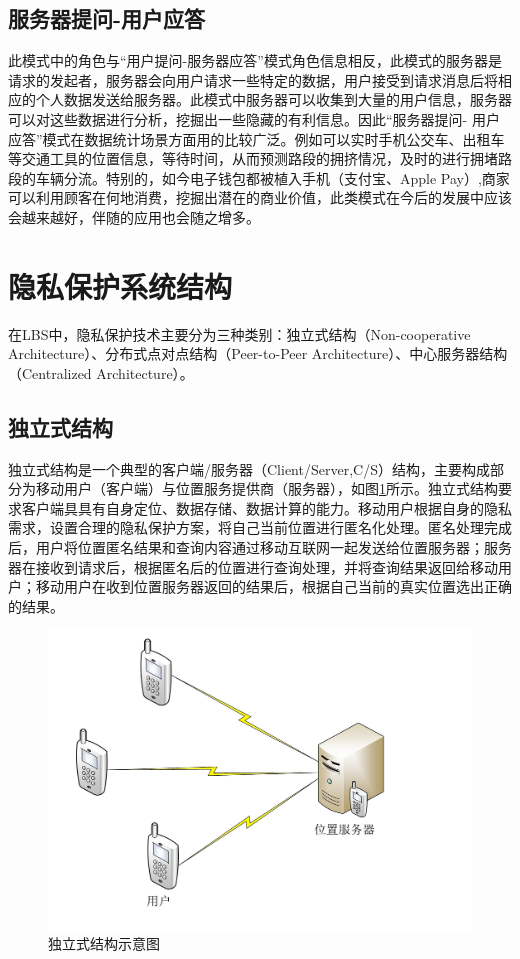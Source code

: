 \subsection{服务器提问-用户应答}
此模式中的角色与“用户提问-服务器应答”模式角色信息相反，此模式的服务器是请求的发起者，服务器会向用户请求一些特定的数据，用户接受到请求消息后将相应的个人数据发送给服务器。此模式中服务器可以收集到大量的用户信息，服务器可以对这些数据进行分析，挖掘出一些隐藏的有利信息。因此“服务器提问- 用户应答”模式在数据统计场景方面用的比较广泛。例如可以实时手机公交车、出租车等交通工具的位置信息，等待时间，从而预测路段的拥挤情况，及时的进行拥堵路段的车辆分流。特别的，如今电子钱包都被植入手机（支付宝、Apple Pay）,商家可以利用顾客在何地消费，挖掘出潜在的商业价值，此类模式在今后的发展中应该会越来越好，伴随的应用也会随之增多。
\section{隐私保护系统结构}
在LBS中，隐私保护技术主要分为三种类别：独立式结构（Non-cooperative Architecture）、分布式点对点结构（Peer-to-Peer Architecture）、中心服务器结构（Centralized Architecture）\cite{WuYinJie}。
\subsection{独立式结构}
独立式结构\cite{ChengR}是一个典型的客户端/服务器（Client/Server,C/S）结构，主要构成部分为移动用户（客户端）与位置服务提供商（服务器），如图\ref{fig:independentConstruction_pdf}所示。独立式结构要求客户端具具有自身定位、数据存储、数据计算的能力。移动用户根据自身的隐私需求，设置合理的隐私保护方案，将自己当前位置进行匿名化处理。匿名处理完成后，用户将位置匿名结果和查询内容通过移动互联网一起发送给位置服务器；服务器在接收到请求后，根据匿名后的位置进行查询处理，并将查询结果返回给移动用户；移动用户在收到位置服务器返回的结果后，根据自己当前的真实位置选出正确的结果。


\begin{figure}[H]
\centering
\includegraphics[width=12cm]{fig/independentConstruction.pdf}
\caption{独立式结构示意图} %
\label{fig:independentConstruction_pdf}
\end{figure}

